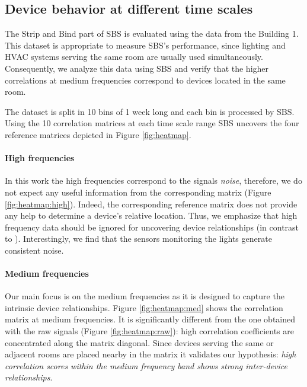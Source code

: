 \subsection{Device behavior at different time scales}
The Strip and Bind part of SBS is evaluated using the data from the Building 1. %
This dataset is appropriate to measure SBS's performance, since lighting and HVAC systems serving the same room are usually used 
simultaneously.
Consequently, we analyze this data using SBS and verify that the higher correlations at medium frequencies correspond to devices located in the same room. %

The dataset is split in 10 bins of 1 week long and each bin is processed by SBS.
Using the 10 correlation matrices at each time scale range SBS uncovers the four reference matrices depicted in 
Figure \ref{fig:heatmap}.

\paragraph{High frequencies}
In this work the high frequencies correspond to the signals \emph{noise}, 
therefore, we do not expect any useful information from the corresponding matrix (Figure \ref{fig:heatmap:high}).
Indeed, the corresponding reference matrix does not provide any help to determine a device's relative location.
Thus, we emphasize that high frequency data should be ignored for uncovering device relationships (in contrast to \cite{romain:iotapp12}).
Interestingly, we find that the sensors monitoring the lights generate consistent noise. %
  
\paragraph{Medium frequencies}
Our main focus is on the medium frequencies as it is designed to capture the intrinsic device relationships.
Figure \ref{fig:heatmap:med} shows the correlation matrix at medium frequencies.
It is significantly different from the one obtained with the raw signals (Figure \ref{fig:heatmap:raw}): high correlation coefficients are concentrated along the matrix diagonal. 
Since devices serving the same or adjacent rooms are placed nearby in the matrix it validates our hypothesis: \emph{high correlation scores within the medium frequency band shows strong inter-device relationships}.

